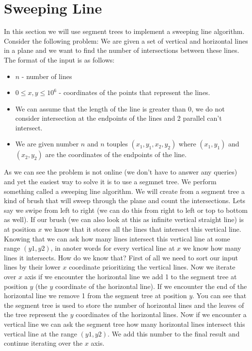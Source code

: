 \documentclass{article}
\begin{document}


\section{Sweeping Line}
In this section we will use segment trees to implement a sweeping line algorithm.
Consider the following problem:
We are given a set of vertical and horizontal lines in a plane and we want to find the number of intersections between these lines.
The format of the input is as follows:
\begin{itemize}
    \item $n$ - number of lines
    \item $0 \leq x,y \leq 10^6$ - coordinates of the points that represent the lines.
    \item We can assume that the length of the line is greater than 0, we do not consider intersection at the endpoints of the lines and 2 parallel can't intersect.
    \item We are given number $n$ and $n$ touples $(x_1, y_1, x_2, y_2)$ where $(x_1, y_1)$ and $(x_2, y_2)$ are the coordinates of the endpoints of the line.
\end{itemize}

As we can see the problem is not online (we don't have to answer any queries) and yet the easiest way to solve it is to use a segmnet tree.
We perform something called a sweeping line algorithm. We will create from a segment tree a kind of brush that will sweep through the plane and count the intersections.
Lets say we swipe from left to right (we can do this from right to left or top to bottom as well). If our brush (we can also look at this as infinite vertical straight line) is at position $x$ we know that it stores all the lines that intersect this vertical line.
Knowing that we can ask how many lines intersect this vertical line at some range $(y1, y2)$, in anoter words for every vertical line at $x$ we know how many lines it intersects. How do we know that?
First of all we need to sort our input lines by their lower $x$ coordinate prioritizing the vertical lines.
Now we iterate over $x$ axis if we encounter the horizontal line we add 1 to the segment tree at position $y$ (the $y$ coordinate of the horizontal line).
If we encounter the end of the horizontal line we remove 1 from the segment tree at position $y$. You can see that the segment tree is used to store the number of horizontal lines
and the leaves of the tree represent the $y$ coordinates of the horizontal lines.
Now if we encounter a vertical line we can ask the segment tree how many horizontal lines intersect this vertical line at the range $(y1, y2)$. 
We add this number to the final result and continue iterating over the $x$ axis. 
\end{document}
